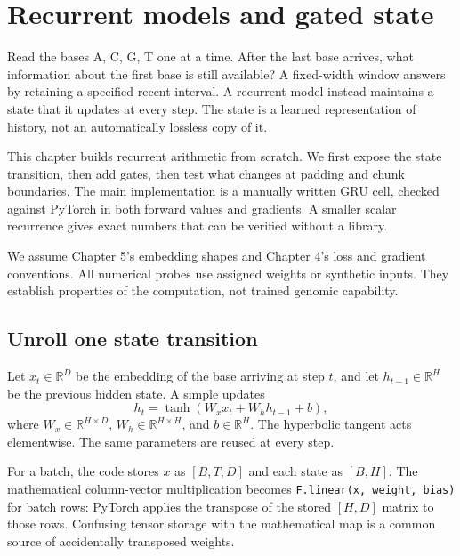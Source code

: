 \chapter{Recurrent models and gated state}

Read the bases A, C, G, T one at a time. After the last base arrives,
what information about the first base is still available? A fixed-width
window answers by retaining a specified recent interval. A recurrent model
instead maintains a state that it updates at every step. The state is a
learned representation of history, not an automatically lossless copy of it.

This chapter builds recurrent arithmetic from scratch. We first expose the
state transition, then add gates, then test what changes at padding and
chunk boundaries. The main implementation is a manually written GRU cell,
checked against PyTorch in both forward values and gradients. A smaller
scalar recurrence gives exact numbers that can be verified without a library.

We assume Chapter 5's embedding shapes and Chapter 4's loss and gradient
conventions. All numerical probes use assigned weights or synthetic inputs.
They establish properties of the computation, not trained genomic capability.

\section{Unroll one state transition}

Let $x_t\in\mathbb R^D$ be the embedding of the base arriving at step $t$,
and let $h_{t-1}\in\mathbb R^H$ be the previous hidden state.
A simple  updates
\begin{equation}
h_t=\tanh(W_xx_t+W_hh_{t-1}+b),
\label{eq:rnn}
\end{equation}
where $W_x\in\mathbb R^{H\times D}$, $W_h\in\mathbb R^{H\times H}$,
and $b\in\mathbb R^H$. The hyperbolic tangent acts elementwise.
The same parameters are reused at every step.


For a batch, the code stores $x$ as $[B,T,D]$ and each state as $[B,H]$.
The mathematical column-vector multiplication becomes
\texttt{F.linear(x, weight, bias)} for batch rows: PyTorch applies the
transpose of the stored $[H,D]$ matrix to those rows.
Confusing tensor storage with the mathematical map is a common source of
accidentally transposed weights.

